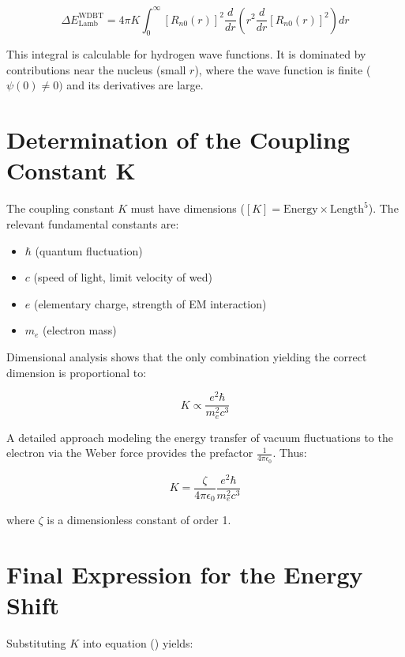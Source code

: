 \begin{equation}
    \Delta E_{\text{Lamb}}^{\text{WDBT}} = 4\pi K \int_0^\infty [R_{n0}(r)]^2 \frac{d}{dr} \left( r^2 \frac{d}{dr} [R_{n0}(r)]^2 \right) dr
\end{equation}

This integral is calculable for hydrogen wave functions. It is dominated by contributions near the nucleus (small $r$), where the wave function is finite ($\psi(0) \neq 0)$ and its derivatives are large.

\section{Determination of the Coupling Constant K}
The coupling constant $K$ must have dimensions ($\left[ K \right] = \text{Energy} \times \text{Length}^5$). The relevant fundamental constants are:

\begin{itemize}
    \item $\hbar$ (quantum fluctuation)
    \item $c$ (speed of light, limit velocity of \gls{wed})
    \item $e$ (elementary charge, strength of EM interaction)
    \item $m_e$ (electron mass)
\end{itemize}

Dimensional analysis shows that the only combination yielding the correct dimension is proportional to:

\begin{equation}
    K \propto \frac{e^2 \hbar}{m_e^2 c^3}
\end{equation}

A detailed approach modeling the energy transfer of vacuum fluctuations to the electron via the Weber force provides the prefactor $\frac{1}{4 \pi \epsilon_0}$. Thus:

\begin{equation}
    K = \frac{\zeta}{4\pi\epsilon_0} \frac{e^2 \hbar}{m_e^2 c^3}
\end{equation}

where $\zeta$ is a dimensionless constant of order 1.

\section{Final Expression for the Energy Shift}
Substituting $K$ into equation () yields:

